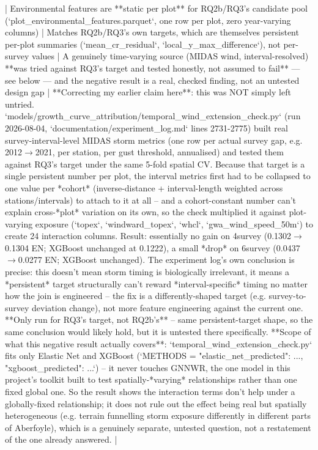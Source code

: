 | Environmental features are **static per plot** for RQ2b/RQ3's candidate pool (`plot_environmental_features.parquet`, one row per plot, zero year-varying columns) | Matches RQ2b/RQ3's own targets, which are themselves persistent per-plot summaries (`mean_cr_residual`, `local_y_max_difference`), not per-survey values | A genuinely time-varying source (MIDAS wind, interval-resolved) **was tried against RQ3's target and tested honestly, not assumed to fail** — see below — and the negative result is a real, checked finding, not an untested design gap | **Correcting my earlier claim here**: this was NOT simply left untried. `models/growth_curve_attribution/temporal_wind_extension_check.py` (run 2026-08-04, `documentation/experiment_log.md` lines 2731-2775) built real survey-interval-level MIDAS storm metrics (one row per actual survey gap, e.g. 2012$\to$2021, per station, per gust threshold, annualised) and tested them against RQ3's target under the same 5-fold spatial CV. Because that target is a single persistent number per plot, the interval metrics first had to be collapsed to one value per *cohort* (inverse-distance + interval-length weighted across stations/intervals) to attach to it at all -- and a cohort-constant number can't explain cross-*plot* variation on its own, so the check multiplied it against plot-varying exposure (`topex`, `windward_topex`, `whcl`, `gwa_wind_speed_50m`) to create 24 interaction columns. Result: essentially no gain on 4survey (0.1302$\to$0.1304 EN; XGBoost unchanged at 0.1222), a small *drop* on 6survey (0.0437$\to$0.0277 EN; XGBoost unchanged). The experiment log's own conclusion is precise: this doesn't mean storm timing is biologically irrelevant, it means a *persistent* target structurally can't reward *interval-specific* timing no matter how the join is engineered -- the fix is a differently-shaped target (e.g. survey-to-survey deviation change), not more feature engineering against the current one. **Only run for RQ3's target, not RQ2b's** -- same persistent-target shape, so the same conclusion would likely hold, but it is untested there specifically. **Scope of what this negative result actually covers**: `temporal_wind_extension_check.py` fits only Elastic Net and XGBoost (`METHODS = {"elastic_net_predicted": ..., "xgboost_predicted": ...}`) -- it never touches GNNWR, the one model in this project's toolkit built to test spatially-*varying* relationships rather than one fixed global one. So the result shows the interaction terms don't help under a globally-fixed relationship; it does not rule out the effect being real but spatially heterogeneous (e.g. terrain funnelling storm exposure differently in different parts of Aberfoyle), which is a genuinely separate, untested question, not a restatement of the one already answered. |

